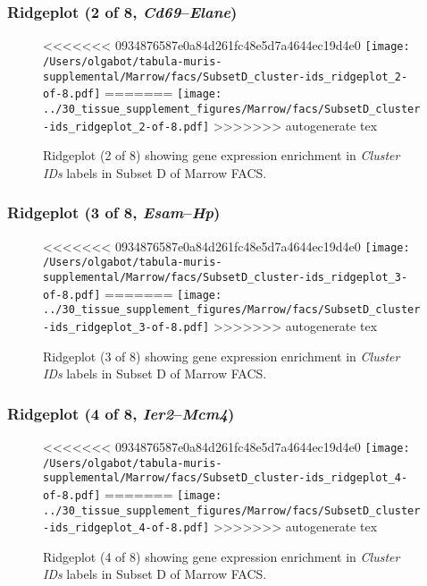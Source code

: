 \clearpage

\subsubsection{Ridgeplot (2 of 8, \emph{Cd69}--\emph{Elane})}
\begin{figure}[h]
\centering
<<<<<<< 0934876587e0a84d261fc48e5d7a4644ec19d4e0
\texttt{[image: /Users/olgabot/tabula-muris-supplemental/Marrow/facs/SubsetD\_cluster-ids\_ridgeplot\_2-of-8.pdf]}
=======
\texttt{[image: ../30\_tissue\_supplement\_figures/Marrow/facs/SubsetD\_cluster-ids\_ridgeplot\_2-of-8.pdf]}
>>>>>>> autogenerate tex

\caption{ Ridgeplot (2 of 8)  showing gene expression enrichment in \emph{Cluster IDs} labels in Subset D of Marrow FACS. }
\end{figure}


\clearpage

\subsubsection{Ridgeplot (3 of 8, \emph{Esam}--\emph{Hp})}
\begin{figure}[h]
\centering
<<<<<<< 0934876587e0a84d261fc48e5d7a4644ec19d4e0
\texttt{[image: /Users/olgabot/tabula-muris-supplemental/Marrow/facs/SubsetD\_cluster-ids\_ridgeplot\_3-of-8.pdf]}
=======
\texttt{[image: ../30\_tissue\_supplement\_figures/Marrow/facs/SubsetD\_cluster-ids\_ridgeplot\_3-of-8.pdf]}
>>>>>>> autogenerate tex

\caption{ Ridgeplot (3 of 8)  showing gene expression enrichment in \emph{Cluster IDs} labels in Subset D of Marrow FACS. }
\end{figure}


\clearpage

\subsubsection{Ridgeplot (4 of 8, \emph{Ier2}--\emph{Mcm4})}
\begin{figure}[h]
\centering
<<<<<<< 0934876587e0a84d261fc48e5d7a4644ec19d4e0
\texttt{[image: /Users/olgabot/tabula-muris-supplemental/Marrow/facs/SubsetD\_cluster-ids\_ridgeplot\_4-of-8.pdf]}
=======
\texttt{[image: ../30\_tissue\_supplement\_figures/Marrow/facs/SubsetD\_cluster-ids\_ridgeplot\_4-of-8.pdf]}
>>>>>>> autogenerate tex

\caption{ Ridgeplot (4 of 8)  showing gene expression enrichment in \emph{Cluster IDs} labels in Subset D of Marrow FACS. }
\end{figure}


